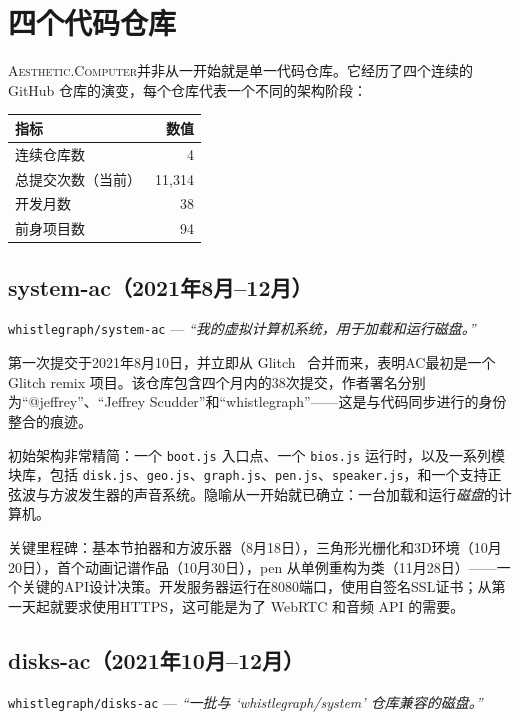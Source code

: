 \documentclass[10pt,letterpaper,twocolumn]{article}
\newcommand{\ac}{\textsc{Aesthetic.Computer}}
\begin{document}
\section{四个代码仓库}

\ac{}并非从一开始就是单一代码仓库。它经历了四个连续的 GitHub 仓库的演变，每个仓库代表一个不同的架构阶段：

\begin{table}[h]
\small
\centering
\begin{tabular}{lr}
\toprule
\textbf{指标} & \textbf{数值} \\
\midrule
连续仓库数 & 4 \\
总提交次数（当前） & 11,314 \\
开发月数 & 38 \\
前身项目数 & 94 \\
\bottomrule
\end{tabular}
\end{table}

\subsection{system-ac（2021年8月--12月）}

\texttt{whistlegraph/system-ac} --- \emph{``我的虚拟计算机系统，用于加载和运行磁盘。''}

第一次提交于2021年8月10日，并立即从 Glitch~\citep{glitch2017} 合并而来，表明AC最初是一个 Glitch remix 项目。该仓库包含四个月内的38次提交，作者署名分别为``@jeffrey''、``Jeffrey Scudder''和``whistlegraph''——这是与代码同步进行的身份整合的痕迹。

初始架构非常精简：一个 \texttt{boot.js} 入口点、一个 \texttt{bios.js} 运行时，以及一系列模块库，包括 \texttt{disk.js}、\texttt{geo.js}、\texttt{graph.js}、\texttt{pen.js}、\texttt{speaker.js}，和一个支持正弦波与方波发生器的声音系统。隐喻从一开始就已确立：一台加载和运行\emph{磁盘}的计算机。

关键里程碑：基本节拍器和方波乐器（8月18日），三角形光栅化和3D环境（10月20日），首个动画记谱作品（10月30日），pen 从单例重构为类（11月28日）——一个关键的API设计决策。开发服务器运行在8080端口，使用自签名SSL证书；从第一天起就要求使用HTTPS，这可能是为了 WebRTC 和音频 API 的需要。

\subsection{disks-ac（2021年10月--12月）}

\texttt{whistlegraph/disks-ac} --- \emph{``一批与 `whistlegraph/system' 仓库兼容的磁盘。''}
\end{document}
